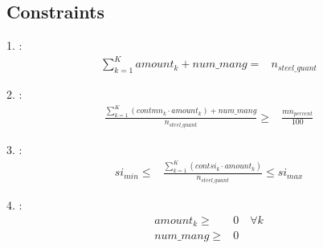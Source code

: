 \documentclass{article}
\begin{document}
\subsection*{Constraints}
1. :
\begin{align*}
\sum_{k=1}^{K} amount_{k} + num\_mang = & n_{steel\_quant}
\end{align*}

2. :
\begin{align*}
\frac{\sum_{k=1}^{K} (contmn_{k} \cdot amount_{k}) + num\_mang}{n_{steel\_quant}} \geq & \frac{mn_{percent}}{100}
\end{align*}

3. :
\begin{align*}
si_{min} \leq & \frac{\sum_{k=1}^{K} (contsi_{k} \cdot amount_{k})}{n_{steel\_quant}} \leq si_{max}
\end{align*}

4. :
\begin{align*}
amount_{k} \geq & 0 \quad \forall k \\
num\_mang \geq & 0
\end{align*}
\end{document}
